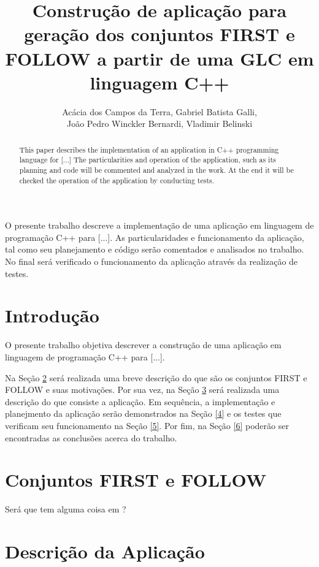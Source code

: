 \documentclass[12pt]{article}
\title{Construção de aplicação para geração dos conjuntos FIRST e FOLLOW a partir de uma GLC em linguagem C++}
\author{Acácia dos Campos da Terra\inst{1}, Gabriel Batista Galli\inst{1},\\ João Pedro Winckler Bernardi\inst{1}, Vladimir Belinski\inst{1} }
\begin{document}
 

\maketitle

\begin{abstract}
 This paper describes the implementation of an application in C++ programming language for [...] The particularities and operation of the application, such as its planning and code will be commented and analyzed in the work. At the end it will be checked the operation of the application by conducting tests.
\end{abstract}
     
\begin{resumo} 
 O presente trabalho descreve a implementação de uma aplicação em linguagem de programação C++ para [...]. As particularidades e funcionamento da aplicação, tal como seu planejamento e código serão comentados e analisados no trabalho. No final será verificado o funcionamento da aplicação através da realização de testes.

\end{resumo}


\section{Introdução}

O presente trabalho objetiva descrever a construção de uma aplicação em linguagem de programação C++ para [...].

Na Seção \ref{2} será realizada uma breve descrição do que são os conjuntos FIRST  e FOLLOW e suas motivações. Por sua vez, na Seção \ref{3} será realizada uma descrição do que consiste a aplicação. Em sequência, a implementação e planejmento da aplicação serão demonstrados na Seção \ref{4} e os testes que verificam seu funcionamento na Seção \ref{5}. Por fim, na Seção \ref{6} poderão ser encontradas as conclusões acerca do trabalho.

\section{Conjuntos FIRST e FOLLOW}
\label{2}

Será que tem alguma coisa em \cite{menezes:00}?

\section{Descrição da Aplicação}
\label{3}
\end{document}
